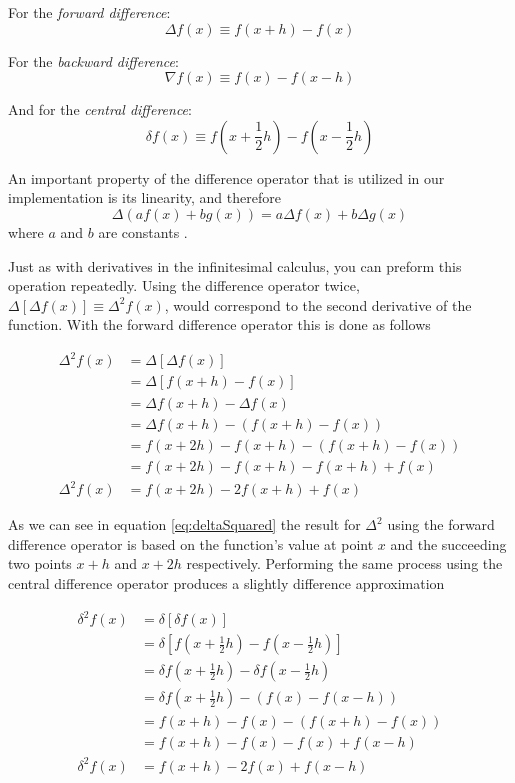 \documentclass[authoryearcitations]{UoYCSproject}
\begin{document}
For the \emph{forward difference}:
\begin{equation}
\label{eq:forwardDiff}
\Delta f(x) \equiv  f(x + h) - f(x)
\end{equation}

For the \emph{backward difference}:
\begin{equation}
\label{eq:backDiff}
\nabla f(x) \equiv  f(x) - f(x - h)
\end{equation}

And for the \emph{central difference}:
\begin{equation}
\label{eq:centDiff}
\delta f(x) \equiv  f(x + \frac{1}{2}h) - f(x - \frac{1}{2}h)
\end{equation}


An important property of the difference operator that is utilized in our implementation is its linearity,
 and therefore
$$\Delta (af(x) + bg(x)) = a \Delta f(x) + b\Delta g(x) $$
where $a$ and $b$ are constants \cite{Hamming}. 

Just as with derivatives in the infinitesimal calculus, you can preform this operation repeatedly. Using the difference
operator twice, $\Delta [\Delta f(x) ] \equiv \Delta ^2 f(x) $, would correspond to the second derivative of the function. 
With the forward difference operator this is done as follows

\begin{align}
 \Delta ^2 f(x)&= \Delta [\Delta f(x)]  \nonumber\\
		&= \Delta [f(x + h) - f(x)] \nonumber\\
		&= \Delta f(x + h) - \Delta f(x) \nonumber\\  
		&= \Delta f(x + h) - (f(x + h) - f(x)) \nonumber \\
		&= f(x + 2h) - f(x + h) - (f(x + h) - f(x)) \nonumber \\ 
		&= f(x + 2h) - f(x + h) - f(x + h) + f(x) \nonumber \\
 \Delta ^2 f(x)	&= f(x + 2h) - 2f(x + h) + f(x) \label{eq:deltaSquared}
\end{align}

As we can see in equation \ref{eq:deltaSquared} the result for $\Delta ^2$ using the forward difference operator is based 
on the function's value at point $x$ and the succeeding two points $x+h$ and $x+2h$ respectively. Performing the same 
process using the central difference operator produces a slightly difference approximation

\begin{align}
 \delta ^2 f(x)&= \delta [\delta f(x)]  \nonumber\\
		&= \delta [f(x + \frac{1}{2}h) - f(x - \frac{1}{2}h)] \nonumber\\
		&= \delta f(x + \frac{1}{2}h) - \delta f(x - \frac{1}{2}h) \nonumber\\  
		&= \delta f(x + \frac{1}{2}h) - (f(x) - f(x - h)) \nonumber \\
		&= f(x + h) - f(x) - (f(x + h) - f(x)) \nonumber \\ 
		&= f(x + h) - f(x) - f(x) + f(x - h) \nonumber \\
 \delta ^2 f(x)	&= f(x + h) - 2f(x) + f(x - h)\label{eq:delta2Squared}
\end{align}
\end{document}

